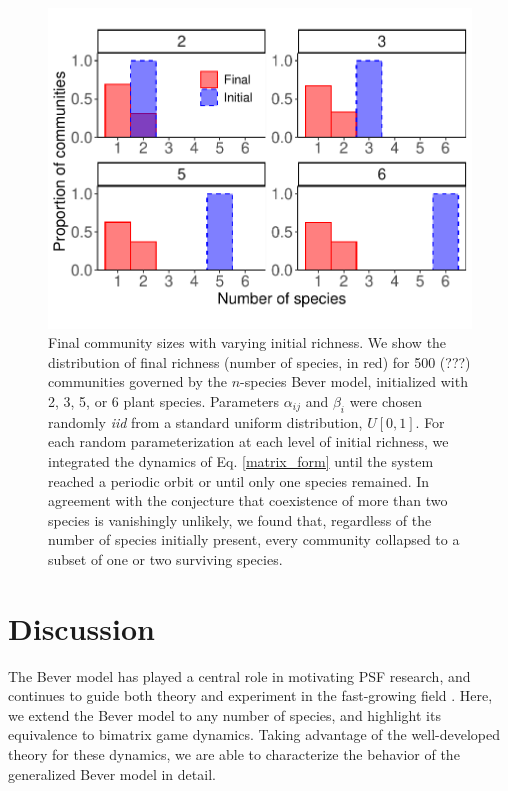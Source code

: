 \documentclass[11pt]{article}
\begin{document}
\begin{figure}
	\centering
	\includegraphics[width=\textwidth]{figure_2.pdf}
	\caption[Final community sizes with varying initial richness]
	{Final community sizes with varying initial richness. We show the distribution of final richness (number of species, in red) for 500 (???) communities governed by the $n$-species Bever model, initialized with 2, 3, 5, or 6 plant species. Parameters $\alpha_{ij}$ and $\beta_{i}$  were chosen randomly \emph{iid} from a standard uniform distribution, $U[0,1]$. For each random parameterization at each level of initial richness, we integrated the dynamics of Eq. \ref{matrix_form} until the system reached a periodic orbit or until only one species remained. In agreement with the conjecture that coexistence of more than two species is vanishingly unlikely, we found that, regardless of the number of species initially present, every community collapsed to a subset of one or two surviving species.}
	\label{fig:histograms}
\end{figure}

\section{Discussion}

The Bever model has played a central role in motivating PSF research, and continues to guide both theory and experiment in the fast-growing field \citep{bever2015maintenance,kandlikar2019winning,ke2020effects}. Here, we extend the Bever model to any number of species, and highlight its equivalence to bimatrix game dynamics. Taking advantage of the well-developed theory for these dynamics, we are able to characterize the behavior of the generalized Bever model in detail.
\end{document}
